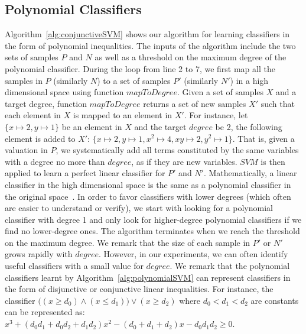 \subsection{Polynomial Classifiers} Algorithm~\ref{alg:conjunctiveSVM} shows our algorithm for learning classifiers in the form of polynomial inequalities.
The inputs of the algorithm include the two sets of samples $P$ and $N$ as well as a threshold on the maximum degree of the polynomial classifier.
During the loop from line 2 to 7, we first map all the samples in $P$ (similarly $N$) to a set of samples $P'$ (similarly $N'$) in a high dimensional space using function $\mathit{mapToDegree}$.
Given a set of samples $X$ and a target degree, function $\mathit{mapToDegree}$ returns a set of new samples $X'$ such that each element in $X$ is mapped to an element in $X'$.
For instance, let $\{x \mapsto 2, y \mapsto 1\}$ be an element in $X$ and the target $\mathit{degree}$ be 2, 
the following element is added to $X'$: $\{x \mapsto 2, y \mapsto 1, x^2 \mapsto 4, xy \mapsto 2, y^2 \mapsto 1\}$.
That is, given a valuation in $P$, we systematically add all terms constituted by the same variables with a degree no more than $\mathit{degree}$, 
as if they are new variables.
$\mathit{SVM}$ is then applied to learn a perfect linear classifier for $P'$ and $N'$. %
Mathematically, a linear classifier in the high dimensional space is the same as a polynomial classifier in the original space~\cite{svm:kernel}.
In order to favor classifiers with lower degrees (which often are easier to understand or verify), 
we start with looking for a polynomial classifier with degree 1 and only look for higher-degree polynomial classifiers if we find no lower-degree ones.
The algorithm terminates when we reach the threshold on the maximum degree.
We remark that the size of each sample in $P'$ or $N'$ grows rapidly with $\mathit{degree}$. 
However, in our experiments, we can often identify useful classifiers with a small value for $\mathit{degree}$.
We remark that the polynomial classifiers learnt by Algorithm~\ref{alg:polynomialSVM} can represent classifiers in the form of disjunctive or conjunctive linear inequalities.
For instance, the classifier $\big((x \ge d_0) \wedge (x \le d_1)\big) \vee (x \ge d_2)$
where $\mathit{d_0 < d_1 < d_2}$ are constants can be represented as: $\mathit{x^3 + (d_0d_1 + d_0d_2 + d_1d_2)x^2 - (d_0 + d_1 + d_2)x - d_0d_1d_2 \geq 0}$.


